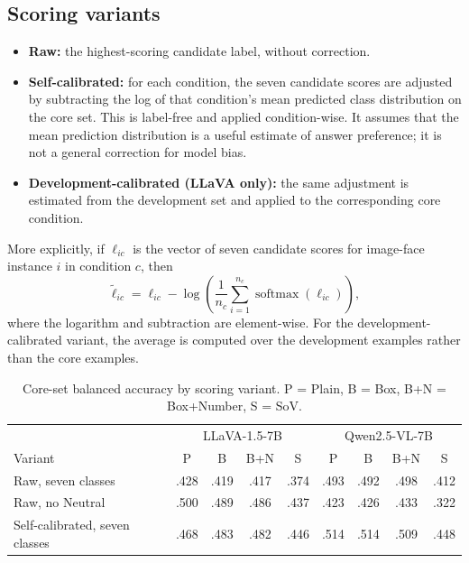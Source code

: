 \documentclass[lettersize,journal]{IEEEtran}
\begin{document}
\subsection{Scoring variants}
\begin{itemize}
\item \textbf{Raw:} the highest-scoring candidate label, without correction.
\item \textbf{Self-calibrated:} for each condition, the seven candidate scores are adjusted by subtracting the log of that condition's mean predicted class distribution on the core set. This is label-free and applied condition-wise. It assumes that the mean prediction distribution is a useful estimate of answer preference; it is not a general correction for model bias.
\item \textbf{Development-calibrated (LLaVA only):} the same adjustment is estimated from the development set and applied to the corresponding core condition.
\end{itemize}
More explicitly, if $\ell_{ic}$ is the vector of seven candidate scores for image-face instance $i$ in condition $c$, then
\[
\tilde{\ell}_{ic}=\ell_{ic}-\log\left(\frac{1}{n_c}
\sum_{i=1}^{n_c}\operatorname{softmax}(\ell_{ic})\right),
\]
where the logarithm and subtraction are element-wise. For the development-calibrated variant, the average is computed over the development examples rather than the core examples.

\begin{table}[!t]
\caption{Core-set balanced accuracy by scoring variant. P = Plain, B = Box, B+N = Box+Number, S = SoV.}
\label{tab:app_levels}
\centering
\scriptsize
\setlength{\tabcolsep}{3pt}
\begin{tabular}{lcccc|cccc}
\toprule
& \multicolumn{4}{c|}{LLaVA-1.5-7B} & \multicolumn{4}{c}{Qwen2.5-VL-7B} \\
Variant & P & B & B+N & S & P & B & B+N & S \\
\midrule
Raw, seven classes & .428 & .419 & .417 & .374 & .493 & .492 & .498 & .412 \\
Raw, no Neutral & .500 & .489 & .486 & .437 & .423 & .426 & .433 & .322 \\
Self-calibrated, seven classes & .468 & .483 & .482 & .446 & .514 & .514 & .509 & .448 \\
\bottomrule
\end{tabular}
\end{table}
\end{document}
